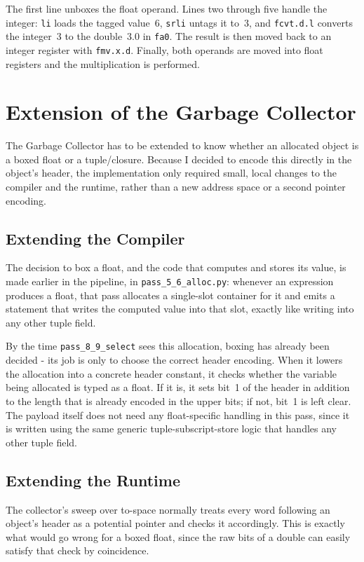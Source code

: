 The first line unboxes the float operand. Lines two through five handle the integer: \texttt{li} loads the tagged value~6, \texttt{srli} untags it to~3, and \texttt{fcvt.d.l} converts the integer~3 to the double~3.0 in \texttt{fa0}. The result is then moved back to an integer register with \texttt{fmv.x.d}. Finally, both operands are moved into float registers and the multiplication is performed.

\section{Extension of the Garbage Collector}

The Garbage Collector has to be extended to know whether an allocated object is a boxed float or a tuple/closure. Because I decided to encode this directly in the object's header, the implementation only required small, local changes to the compiler and the runtime, rather than a new address space or a second pointer encoding.

\subsection{Extending the Compiler}

The decision to box a float, and the code that computes and stores its value, is made earlier in the pipeline, in \texttt{pass\_5\_6\_alloc.py}: whenever an expression produces a float, that pass allocates a single-slot container for it and emits a statement that writes the computed value into that slot, exactly like writing into any other tuple field.

By the time \texttt{pass\_8\_9\_select} sees this allocation, boxing has already been decided - its job is only to choose the correct header encoding. When it lowers the allocation into a concrete header constant, it checks whether the variable being allocated is typed as a float. If it is, it sets bit~1 of the header in addition to the length that is already encoded in the upper bits; if not, bit~1 is left clear. The payload itself does not need any float-specific handling in this pass, since it is written using the same generic tuple-subscript-store logic that handles any other tuple field.

\subsection{Extending the Runtime}

The collector's sweep over to-space normally treats every word following an object's header as a potential pointer and checks it accordingly. This is exactly what would go wrong for a boxed float, since the raw bits of a double can easily satisfy that check by coincidence.


